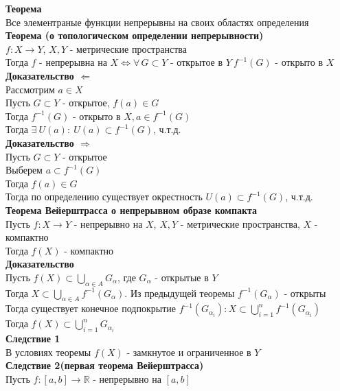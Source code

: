 \documentclass[12pt]{article}
\begin{document}
\textbf{Теорема}\\
Все элементраные функции непрерывны на своих областях определения\\
\textbf{Теорема (о топологическом определении непрерывности)}\\
$f: X \rightarrow Y$, $X, Y$ - метрические пространства\\
Тогда $f$ - непрерывна на $X \Leftrightarrow \forall\,G\subset Y$ - открытое в $Y\ f^{-1}(G)$ - открыто в $X$\\
\textbf{Доказательство $\Leftarrow$}\\
Рассмотрим $a \in X$\\
Пусть $G\subset Y$ - открытое, $f(a) \in G$\\
Тогда $f^{-1}(G)$ - открыто в $X, a \in f^{-1}(G)$\\
Тогда $\exists\ U(a):\ U(a) \subset f^{-1}(G)$, ч.т.д.\\
\textbf{Доказательство $\Rightarrow$}\\
Пусть $G \subset Y$ - открытое\\
Выберем $a \subset f^{-1}(G)$\\
Тогда $f(a) \in G$\\
Тогда по определению существует окрестность $U(a) \subset f^{-1}(G)$, ч.т.д.\\
\textbf{Теорема Вейерштрасса о непрерывном образе компакта}\\
Пусть $f:X\rightarrow Y$ - непрерывно на $X$, $X,Y$ - метрические пространства, $X$ - компактно\\
Тогда $f(X)$ - компактно\\
\textbf{Доказательство}\\
Пусть $f(X) \subset \bigcup_{\alpha \in A} G_\alpha$, где $G_\alpha$ - открытые в $Y$\\
Тогда $X \subset \bigcup_{\alpha \in A} f^{-1}(G_\alpha)$. Из предыдущей теоремы $f^{-1}(G_\alpha)$ - открыты\\
Тогда существует конечное подпокрытие $f^{-1}(G_{\alpha_i}): X \subset \bigcup_{i=1}^n f^{-1}(G_{\alpha_i})$\\
Тогда $f(X) \subset \bigcup_{i=1}^n G_{\alpha_i}$\\
\textbf{Следствие 1}\\
В условиях теоремы $f(X)$ - замкнутое и ограниченное в $Y$\\
\textbf{Следствие 2(первая теорема Вейерштрасса)}\\
Пусть $f: [a,b] \rightarrow \mathbb{R}$ - непрерывно на $[a,b]$\\
\end{document}
